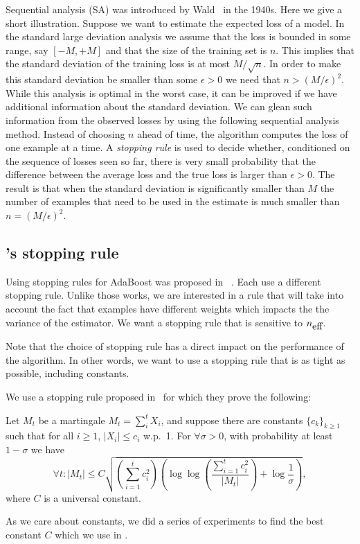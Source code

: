 Sequential analysis (SA) was introduced by
Wald~\cite{wald_sequential_1973} in the 1940s.  Here we give a short
illustration. Suppose we want to estimate the expected loss of a
model. In the standard large deviation analysis we assume that the
loss is bounded in some range, say $[-M,+M]$ and that the size of the
training set is $n$. This implies that the standard deviation of the
training loss is at most $M/\sqrt{n}$. In order to make this standard
deviation be smaller than some $\epsilon>0$ we need that $n >
(M/\epsilon)^2$. While this analysis is optimal in the worst case, it
can be improved if we have additional information about the standard
deviation. We can glean such information from the observed losses by
using the following sequential analysis method. Instead of choosing
$n$ ahead of time, the algorithm computes the loss of one example at a
time. A {\em stopping rule} is used to decide whether, conditioned on
the sequence of losses seen so far, there is very small probability
that the difference between the average loss and the true loss is
larger than $\epsilon>0$. The result is that when the standard
deviation is significantly smaller than $M$ the number of examples
that need to be used in the estimate is much smaller than
$n=(M/\epsilon)^2$.

\subsection{\Sparrow's stopping rule} \label{sec:balsubramani}

Using stopping rules for AdaBoost was proposed in
~\cite{domingo_scaling_2000, bradley_filterboost:_2007}. Each use a
different stopping rule. Unlike those works, we are interested in a
rule that will take into account the fact that examples have different
weights which impacts the the variance of the estimator. We want a
stopping rule that is sensitive to ${n_{\mbox{eff}}}$.

Note that the choice of stopping rule has a direct impact on the
performance of the algorithm. In other words, we want to use a
stopping rule that is as tight as possible, including constants.

We use a stopping rule proposed in~\cite{balsubramani_sharp_2014}
for which they prove the following:

\begin{theorem} \label{thm:balsubramani}
  Let $M_t$ be a martingale $M_t = \sum_i^t X_i$,
  and suppose there are constants $\{c_k\}_{k \geq 1}$ such that
  for all $i \geq 1$, $|X_i| \leq c_i$ w.p.\ 1.
  For $\forall \sigma > 0$, with probability at least $1 - \sigma$ we have
  \[
  \forall t: |M_t| \leq C \sqrt{
    \left( \sum_{i=1}^t c_i^2 \right)
    \left( \log \log \left( \frac{ \sum_{i=1}^t c_i^2 }{ |M_t| }\right) +
    \log \frac{1}{\sigma} \right)
  },
  \]
  where $C$ is a universal constant.
\end{theorem}

As we care about constants, we did a series of experiments to find the
best constant $C$ which we use in \Sparrow.
